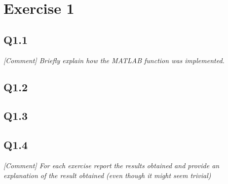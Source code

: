 \section{Exercise 1} \label{P1}
\subsection{Q1.1}
\textit{[Comment] Briefly explain how the MATLAB function was implemented.}

\subsection{Q1.2}
\subsection{Q1.3}
\subsection{Q1.4}

\textit{[Comment] For each exercise report the results obtained and provide an explanation of the result obtained (even though it might seem trivial) } 